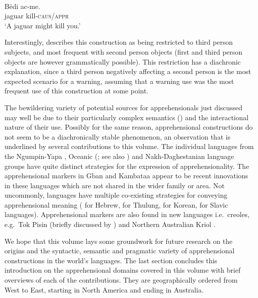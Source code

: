 \documentclass[output=paper,colorlinks,citecolor=brown
]{langscibook}
\begin{document}
\ea \label{ex:intro27} 
\\
\gll Bëdi ac-me. \\
jaguar kill-\textsc{caus/appr} \\
\glt `A jaguar might kill you.' 
\z

\noindent Interestingly, \citet[443]{fleck2003} describes this construction as being restricted to third person subjects, and most frequent with second person objects (first and third person objects are however grammatically possible). This restriction has a diachronic explanation, since a third person negatively affecting a second person is the most expected scenario for a warning, assuming that a warning use was the most frequent use of this construction at some point.

The bewildering variety of potential sources for apprehensionals just discussed may well be due to their particularly complex semantics (\cite{kutevaetal2019,anderboisdabkowskiupcoming}) and the interactional nature of their use. Possibly for the same reason, apprehensional constructions do not seem to be a diachronically stable phenomenon, an observation that is underlined by several contributions to this volume. The individual languages from the Ngumpin-Yapa \citep{chapters/browne}, Oceanic (\citealt{chapters/francois}; see also \cite{smithdennis2021}) and Nakh\hyp Daghestanian \citep{chapters/daniel} language groups have quite distinct strategies for the expression of apprehensionality. The apprehensional markers in Gban \citep{chapters/fedotov} and Kambataa \citep{chapters/treis} appear to be recent innovations in these languages which are not shared in the wider family or area. Not uncommonly, languages have multiple co-existing strategies for conveying apprehensional meaning (\citealt{chapters/francez} for Hebrew, \citealt{chapters/lahaussois} for Thulung, \citealt{chapters/rhee-kuteva} for Korean,  \citealt{chapters/wiemer} for Slavic languages). Apprehensional markers are also found in new languages i.e.\ creoles, e.g.\ Tok Pisin (briefly discussed by \cite{smithdennis2021}) and Northern Australian Kriol \citep{angeloschultzeberndt2016, phillips2021}.


We hope that this volume lays some groundwork for future research on the origins and the syntactic, semantic and pragmatic variety of apprehensional constructions in the world's languages. The last section concludes this introduction on the apprehensional domains covered in this volume with brief overviews of each of the contributions. They are geographically ordered from West to East, starting in North America and ending in Australia.
\end{document}
